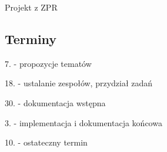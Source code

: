 Projekt z Z\-P\-R

\subsection*{Terminy}


\begin{DoxyItemize}
\item 7. -\/ propozycje tematów
\item 18. -\/ ustalanie zespołów, przydział zadań
\item 30. -\/ dokumentacja wstępna
\item 3. -\/ implementacja i dokumentacja końcowa
\item 10. -\/ ostateczny termin 
\end{DoxyItemize}
